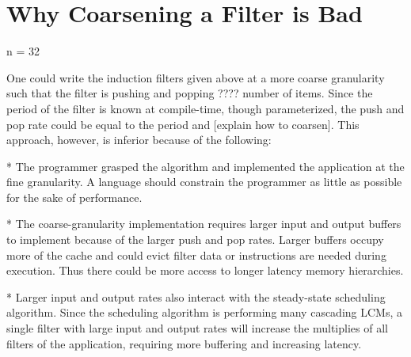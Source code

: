 \section{Why Coarsening a Filter is Bad}
\label{sec:coarsen}






n = 32

One could write the induction filters given above at a more coarse granularity
such that the filter is pushing and popping ???? number of items.
Since the period of the filter is known at compile-time, though
parameterized, the push and pop rate could be equal to the period and
[explain how to coarsen].  This approach, however, is inferior because
of the following:

* The programmer grasped the algorithm and implemented the application
at the fine granularity.  A language should constrain the programmer
as little as possible for the sake of performance.

* The coarse-granularity implementation requires larger input and
output buffers to implement because of the larger push and pop rates.
Larger buffers occupy more of the cache and could evict filter data or
instructions are needed during execution.  Thus there could be more
access to longer latency memory hierarchies.

* Larger input and output rates also interact with the steady-state
scheduling algorithm.  Since the scheduling algorithm is performing
many cascading LCMs, a single filter with large input and output rates
will increase the multiplies of all filters of the application,
requiring more buffering and increasing latency.